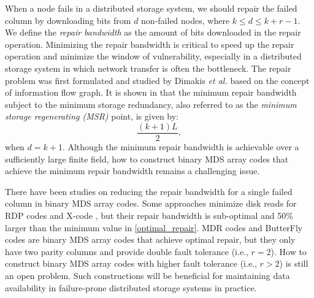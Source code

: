\documentclass[conference]{IEEEtran}
\begin{document}
When a node fails in a distributed storage system, we should repair the failed
column by downloading bits from $d$ non-failed nodes, where $k\le d\le k+r-1$.
We define the {\em repair bandwidth} as the amount of bits downloaded in the
repair operation.  Minimizing the repair bandwidth is critical to speed up the
repair operation and minimize the window of vulnerability, especially in a
distributed storage system in which network transfer is often the bottleneck.
The repair problem was first formulated and studied by Dimakis {\em et al.}
\cite{dimakis2010network} based on the concept of information flow graph.
It is shown in \cite{dimakis2010network} that the minimum repair bandwidth
subject to the minimum storage redundancy, also referred to as the
{\em minimum storage regenerating (MSR)} point, is given by:
\begin{equation}
\frac{(k+1)L}{2},
\label{optimal_repair}
\end{equation}
when $d=k+1$.  Although the minimum repair bandwidth is achievable
\cite{dimakis2010network,tamo2013zigzag} over a
sufficiently large finite field, how to construct binary MDS array codes that
achieve the minimum repair bandwidth remains a challenging issue.

There have been studies on reducing the repair bandwidth for a single failed
column in binary MDS array codes.  Some approaches minimize disk reads for RDP
codes \cite{xiang2010optimal} and X-code \cite{xu2014single}, but their repair
bandwidth is sub-optimal and 50\% larger than the minimum value in
\eqref{optimal_repair}.  MDR codes \cite{Wang2013MDR,Wang2016Two} and
ButterFly codes \cite{pamies2016opening} are binary MDS array codes that achieve
optimal repair, but they only have two parity columns and provide double fault
tolerance (i.e., $r=2$).  How to construct binary MDS array codes with higher
fault tolerance (i.e., $r > 2$) is still an open problem.  Such constructions
will be beneficial for maintaining data availability in failure-prone
distributed storage systems in practice.

\end{document}
